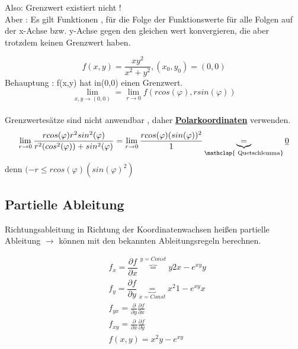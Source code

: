 Also: Grenzwert existiert nicht !\\
Aber : Es gilt Funktionen , für die Folge der Funktionswerte für alle Folgen auf der x-Achse bzw. y-Achse gegen den gleichen wert konvergieren, die aber trotzdem keinen Grenzwert haben.  
\begin{example}
$$f(x,y)= \frac{xy^2}{x^2+y^2}, (x_0, y_0)= (0 ,0) $$
Behauptung : f(x,y) hat in(0,0) einen Grenzwert.\\
$$\lim_{x,y \to (0,0)} = \lim_{r \to 0} 
f(r cos(\varphi) , r sin(\varphi) )$$\\
Grenzwertesätze sind nicht anwendbar , daher \textbf{\href{https://de.serlo.org/mathe/deutschland/bayern/realschule/klasse-10/zweig-trigonometrie/polarkoordinaten}{Polarkoordinaten}} verwenden.
\begin{equation}
\lim_{r \to 0} 
\dfrac
{r cos (\varphi) r^2 sin^2(\varphi)}{r^2(cos^2(\varphi)) + sin^2(\varphi) } =
\lim_{r \to 0} 
\dfrac{r cos(\varphi)(sin(\varphi))^2}{1} 
\underbrace{=}_{\mathclap{\text{ Quetschlemma}}} \underline{0}
\end{equation}
denn $ ( -r \leq r cos(\varphi) (sin(\varphi)^2)  $
\end{example}

\subsection{Partielle Ableitung}
Richtungsableitung in Richtung der Koordinatenwachsen heißen partielle Ableitung  $\rightarrow$ können mit den bekannten Ableitungsregeln berechnen.
\begin{example}
\begin{align*}
&f_x = \dfrac{\partial f}{\partial x } \overbrace{=}^{y = Const} y 2x - e^{xy}y \\
&f_y = \dfrac{\partial f}{\partial y } \underbrace{=}_{x = Const}  x^2 1-  e^{xy}x \\
&f_{yx}= \frac{\partial}{\partial y}\frac{\partial f}{\partial x}\\
&f_{xy}= \frac{\partial}{\partial x}\frac{\partial f}{\partial y}\\
&f(x,y)= x^2y -e^{xy}
\end{align*}
\end{example}
